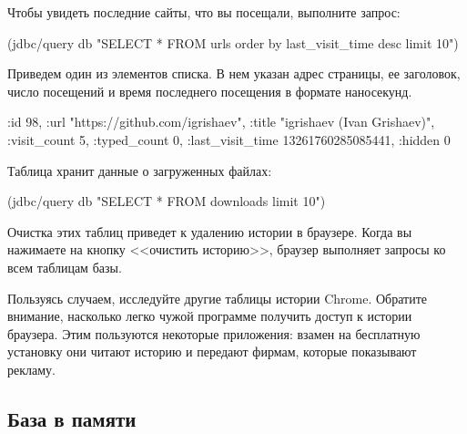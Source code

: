 \begin{english}
  \begin{clojure}
  \end{clojure}
\end{english}

Чтобы увидеть последние сайты, что вы посещали, выполните запрос:

\begin{english}
  \begin{clojure}
(jdbc/query db "SELECT * FROM urls order by last_visit_time desc limit 10")
  \end{clojure}
\end{english}

Приведем один из элементов списка. В нем указан адрес страницы, ее заголовок, число посещений и время последнего посещения в формате наносекунд.

\begin{english}
  \begin{clojure}
{:id 98,
 :url "https://github.com/igrishaev",
 :title "igrishaev (Ivan Grishaev)",
 :visit_count 5,
 :typed_count 0,
 :last_visit_time 13261760285085441,
 :hidden 0}
  \end{clojure}
\end{english}

Таблица  хранит данные о загруженных файлах:

\begin{english}
  \begin{clojure}
(jdbc/query db "SELECT * FROM downloads limit 10")
  \end{clojure}
\end{english}

Очистка этих таблиц приведет к удалению истории в браузере. Когда вы нажимаете на кнопку <<очистить историю>>, браузер выполняет запросы  ко всем таблицам базы.

Пользуясь случаем, исследуйте другие таблицы истории Chrome. Обратите внимание, насколько легко чужой программе получить доступ к истории браузера. Этим пользуются некоторые приложения: взамен на бесплатную установку они читают историю и передают фирмам, которые показывают рекламу.

\subsection{База в памяти}

